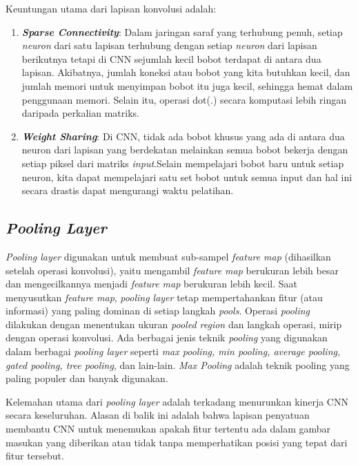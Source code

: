 Keuntungan utama dari lapisan konvolusi adalah:
\begin{enumerate}
	\item \textbf{\textit{Sparse Connectivity}}: Dalam jaringan saraf yang terhubung penuh, setiap \textit{neuron} dari satu lapisan terhubung dengan setiap \textit{neuron} dari lapisan berikutnya tetapi di CNN sejumlah kecil bobot terdapat di antara dua lapisan. Akibatnya, jumlah koneksi atau bobot yang kita butuhkan kecil, dan jumlah memori untuk menyimpan bobot itu juga kecil, sehingga hemat dalam penggunaan memori. Selain itu, operasi dot(.) secara komputasi lebih ringan daripada perkalian matriks.
	\item \textbf{\textit{Weight Sharing}}: Di CNN, tidak ada bobot khusus yang ada di antara dua neuron dari lapisan yang berdekatan melainkan semua bobot bekerja dengan setiap piksel dari matriks \textit{input}.Selain mempelajari bobot baru untuk setiap neuron, kita dapat mempelajari satu set bobot untuk semua input dan hal ini secara drastis dapat mengurangi waktu pelatihan.
\end{enumerate}

\subsection{\textit{Pooling Layer}}
\label{subsec:pooling-layer}

\textit{Pooling layer} digunakan untuk membuat sub-sampel \textit{feature map} (dihasilkan setelah operasi konvolusi), yaitu mengambil \textit{feature map} berukuran lebih besar dan mengecilkannya menjadi \textit{feature map} berukuran lebih kecil. Saat menyusutkan \textit{feature map}, \textit{pooling layer} tetap mempertahankan fitur (atau informasi) yang paling dominan di setiap langkah \textit{pools}. Operasi \textit{pooling} dilakukan dengan menentukan ukuran \textit{pooled region} dan langkah operasi, mirip dengan operasi konvolusi. Ada berbagai jenis teknik \textit{pooling} yang digunakan dalam berbagai \textit{pooling layer} seperti \textit{max pooling, min pooling, average pooling, gated pooling, tree pooling}, dan lain-lain. \textit{Max Pooling} adalah teknik pooling yang paling populer dan banyak digunakan.

Kelemahan utama dari \textit{pooling layer} adalah terkadang menurunkan kinerja CNN secara keseluruhan. Alasan di balik ini adalah bahwa lapisan penyatuan membantu CNN untuk menemukan apakah fitur tertentu ada dalam gambar masukan yang diberikan atau tidak tanpa memperhatikan posisi yang tepat dari fitur tersebut.

